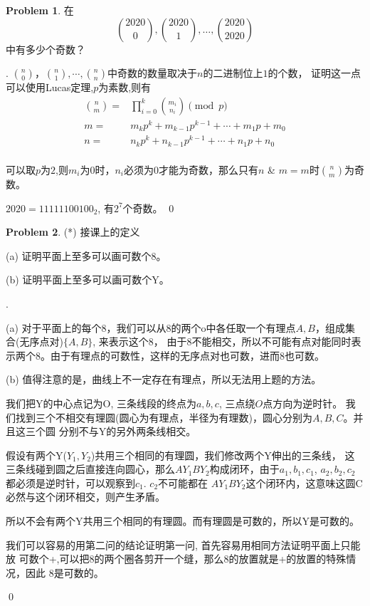 \documentclass[UTF8]{ctexart}
\newenvironment{sol}
  {\par\vspace{3mm}\noindent{\it Solution}.}
  {\qed \\ \medskip}
\theoremstyle{definition}
\newtheorem{problem}{Problem}
\begin{document}
\begin{problem}
在
\[
\binom{2020}{0}, \binom{2020}{1}, \dots, \binom{2020}{2020}
\]
中有多少个奇数？
\begin{sol}
  $\binom{n}{0}，\binom{n}{1},\cdots,\binom{n}{n}$中奇数的数量取决于$n$的二进制位上$1$的个数，
  证明这一点可以使用Lucas定理,$p$为素数,则有
  $$
  \begin{aligned}
    \binom{n}{m}=&\prod_{i=0}^k\binom{m_i}{n_i}\pmod p\\
    m =& m_kp^k+m_{k-1}p^{k-1}+\cdots+m_1p+m_0\\
    n =& n_kp^k+n_{k-1}p^{k-1}+\cdots+n_1p+n_0\\
  \end{aligned}  
  $$

  可以取$p$为$2$,则$m_i$为0时，$n_i$必须为0才能为奇数，那么只有$n$ \& $m = m$时$\binom{n}{m}$为奇数。

  $2020=11111100100_2$, 有$2^7$个奇数。
\end{sol}
\end{problem}

\begin{problem}(*)
接课上的定义

(a) 证明平面上至多可以画可数个8。

(b) 证明平面上至多可以画可数个Y。
\begin{sol}

  (a) 对于平面上的每个8，我们可以从8的两个o中各任取一个有理点$A,B$，组成集合(无序点对)$\{A,B\}$, 来表示这个8，
  由于8不能相交，所以不可能有点对能同时表示两个8。由于有理点的可数性，这样的无序点对也可数，进而8也可数。
  
  (b) 值得注意的是，曲线上不一定存在有理点，所以无法用上题的方法。

  我们把Y的中心点记为O, 三条线段的终点为$a,b,c$, 三点绕$O$点方向为逆时针。
  我们找到三个不相交有理圆(圆心为有理点，半径为有理数)，圆心分别为$A, B, C$。并且这三个圆
  分别不与Y的另外两条线相交。

  假设有两个Y($Y_1, Y_2$)共用三个相同的有理圆，我们修改两个Y伸出的三条线，
  这三条线碰到圆之后直接连向圆心，那么$AY_1BY_2$构成闭环，由于$a_1, b_1, c_1$,
  $a_2, b_2, c_2$都必须是逆时针，可以观察到$c_1$. $c_2$不可能都在
  $AY_1BY_2$这个闭环内，这意味这圆C必然与这个闭环相交，则产生矛盾。

  所以不会有两个Y共用三个相同的有理圆。而有理圆是可数的，所以Y是可数的。

  我们可以容易的用第二问的结论证明第一问, 首先容易用相同方法证明平面上只能放
  可数个+,可以把8的两个圈各剪开一个缝，那么8的放置就是+的放置的特殊情况，因此
  8是可数的。

\end{sol}
\end{problem}
\end{document}
